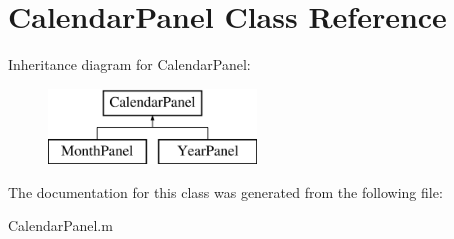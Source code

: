 \hypertarget{class_calendar_panel}{\section{Calendar\+Panel Class Reference}
\label{class_calendar_panel}
}
Inheritance diagram for Calendar\+Panel\+:\begin{figure}[H]
\begin{center}
\leavevmode
\includegraphics[height=2.000000cm]{class_calendar_panel}
\end{center}
\end{figure}


The documentation for this class was generated from the following file\+:\begin{DoxyCompactItemize}
\item 
Calendar\+Panel.\+m\end{DoxyCompactItemize}
